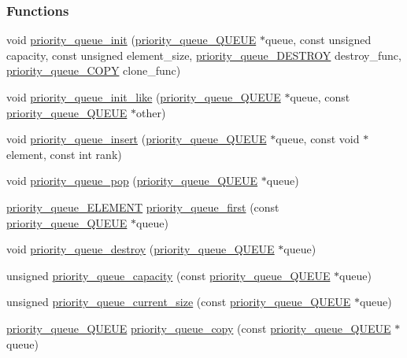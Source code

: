 \subsubsection*{Functions}
\begin{DoxyCompactItemize}
\item 
void \hyperlink{a00011_a95235adc9e596748082c66067fae13dc}{priority\-\_\-queue\-\_\-init} (\hyperlink{a00007}{priority\-\_\-queue\-\_\-\-Q\-U\-E\-U\-E} $\ast$queue, const unsigned capacity, const unsigned element\-\_\-size, \hyperlink{a00011_a8b0749461227267e0856a15ce59854c1}{priority\-\_\-queue\-\_\-\-D\-E\-S\-T\-R\-O\-Y} destroy\-\_\-func, \hyperlink{a00011_a8be2278e923a91d0166c68a26e438ee0}{priority\-\_\-queue\-\_\-\-C\-O\-P\-Y} clone\-\_\-func)
\item 
void \hyperlink{a00011_ab66c88738d726c25c13b70d983d59395}{priority\-\_\-queue\-\_\-init\-\_\-like} (\hyperlink{a00007}{priority\-\_\-queue\-\_\-\-Q\-U\-E\-U\-E} $\ast$queue, const \hyperlink{a00007}{priority\-\_\-queue\-\_\-\-Q\-U\-E\-U\-E} $\ast$other)
\item 
void \hyperlink{a00011_a072c6297756a780f0bdb180669f7e675}{priority\-\_\-queue\-\_\-insert} (\hyperlink{a00007}{priority\-\_\-queue\-\_\-\-Q\-U\-E\-U\-E} $\ast$queue, const void $\ast$element, const int rank)
\item 
void \hyperlink{a00011_afdd086076bc9e624185b0bce2562db59}{priority\-\_\-queue\-\_\-pop} (\hyperlink{a00007}{priority\-\_\-queue\-\_\-\-Q\-U\-E\-U\-E} $\ast$queue)
\item 
\hyperlink{a00006}{priority\-\_\-queue\-\_\-\-E\-L\-E\-M\-E\-N\-T} \hyperlink{a00011_af21869cc07d5231e36eb36a338569948}{priority\-\_\-queue\-\_\-first} (const \hyperlink{a00007}{priority\-\_\-queue\-\_\-\-Q\-U\-E\-U\-E} $\ast$queue)
\item 
void \hyperlink{a00011_af517dcd382eeb2228104ba92d5064c8e}{priority\-\_\-queue\-\_\-destroy} (\hyperlink{a00007}{priority\-\_\-queue\-\_\-\-Q\-U\-E\-U\-E} $\ast$queue)
\item 
unsigned \hyperlink{a00011_a1472e39366d3b49bb0e04158791786e4}{priority\-\_\-queue\-\_\-capacity} (const \hyperlink{a00007}{priority\-\_\-queue\-\_\-\-Q\-U\-E\-U\-E} $\ast$queue)
\item 
unsigned \hyperlink{a00011_a3c7adec21393e53de36fc762d3e7e205}{priority\-\_\-queue\-\_\-current\-\_\-size} (const \hyperlink{a00007}{priority\-\_\-queue\-\_\-\-Q\-U\-E\-U\-E} $\ast$queue)
\item 
\hyperlink{a00007}{priority\-\_\-queue\-\_\-\-Q\-U\-E\-U\-E} \hyperlink{a00011_a0329ab35ba1e693d907411671560da63}{priority\-\_\-queue\-\_\-copy} (const \hyperlink{a00007}{priority\-\_\-queue\-\_\-\-Q\-U\-E\-U\-E} $\ast$queue)

\end{DoxyCompactItemize}
